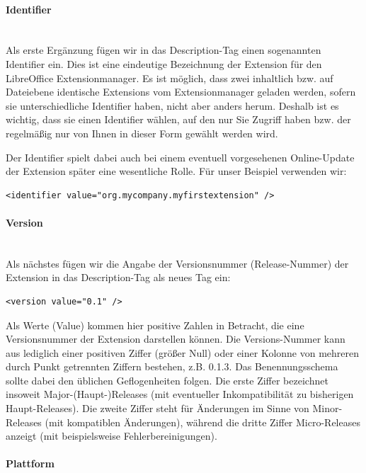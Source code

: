 \documentclass[a4paper,10pt,pagesize,titlepage]{scrbook}
\begin{document}
\paragraph*{Identifier}$~~$\\

Als erste Ergänzung fügen wir in das Description-Tag einen sogenannten Identifier ein. Dies ist eine eindeutige Bezeichnung der Extension für den LibreOffice Extensionmanager. Es ist möglich, dass zwei inhaltlich bzw. auf Dateiebene identische Extensions vom Extensionmanager geladen werden, sofern sie unterschiedliche Identifier haben, nicht aber anders herum. Deshalb ist es wichtig, dass sie einen Identifier wählen, auf den nur Sie Zugriff haben bzw. der regelmäßig nur von Ihnen in dieser Form gewählt werden wird.

Der Identifier spielt dabei auch bei einem eventuell vorgesehenen Online-Update der Extension später eine wesentliche Rolle. Für unser Beispiel verwenden wir:
\begin{lstlisting}
<identifier value="org.mycompany.myfirstextension" />
\end{lstlisting}

\paragraph*{Version}$~~$\\

Als nächstes fügen wir die Angabe der Versionsnummer (Release-Nummer) der Extension in das Description-Tag als neues Tag ein:
\begin{lstlisting}
<version value="0.1" />
\end{lstlisting}
Als Werte (Value) kommen hier positive Zahlen in Betracht, die eine Versionsnummer der Extension darstellen können. Die Versions-Nummer kann aus lediglich einer positiven Ziffer (größer Null) oder einer Kolonne von mehreren durch Punkt getrennten Ziffern bestehen, z.B. 0.1.3. Das Benennungsschema sollte dabei den üblichen Geflogenheiten folgen. Die erste Ziffer bezeichnet insoweit Major-(Haupt-)Releases (mit eventueller Inkompatibilität zu bisherigen Haupt-Releases). Die zweite Ziffer steht für Änderungen im Sinne von Minor-Releases (mit kompatiblen Änderungen), während die dritte Ziffer Micro-Releases anzeigt (mit beispielsweise Fehlerbereinigungen).

\paragraph*{Plattform}$~~$\\
\end{document}
